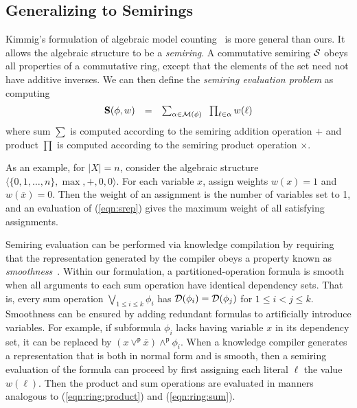 \documentclass[twoside,11pt]{article}
\newcommand{\pand}{\mathbin{\land^\textsf{p}}}
\newcommand{\por}{\mathbin{\lor^\textsf{p}}}
\newcommand{\obar}[1]{\overline{#1}}
\newcommand{\lit}{\ell}
\newcommand{\dependencyset}{{\cal D}}
\newcommand{\semiring}{{\cal S}}
\newcommand{\srep}{\textbf{S}}
\newcommand{\radd}{+}
\newcommand{\rmul}{\times}
\newcommand{\modelset}{{\cal M}}
\begin{document}
\subsection{Generalizing to Semirings}

Kimmig's formulation of algebraic model
counting~\cite{kimmig:jal:2017} is more general than ours.  It allows
the algebraic structure to be a \emph{semiring}.  A commutative
semiring $\semiring$ obeys all properties of a commutative ring, except that the
elements of the set need not have additive inverses.
We can then define the {\em semiring evaluation problem} as computing
  \begin{equation}
    \begin{array}{rcl}
    \srep(\phi, w) & = & \sum_{\alpha \in \modelset(\phi)} \;\; \prod_{\lit \in \alpha} w(\ell) \label{eqn:srep}
    \end{array}
  \end{equation}
  where sum $\sum$ is computed according to the semiring addition operation $\radd$ and product $\prod$
  is computed according to the semiring product operation $\rmul$.

  As an example, for $|X| = n$, consider the algebraic structure
  $\langle \{0, 1, \ldots, n\}, \max, +, 0, 0 \rangle$.
For each variable $x$, assign weights
$w(x) = 1$ and $w(\obar{x}) = 0$.  Then the
weight of an assignment is the number of variables set to 1, and an
evaluation of (\ref{eqn:srep}) gives the maximum weight of all
satisfying assignments.

Semiring evaluation can be performed via knowledge compilation
by requiring 
that the representation generated by
the compiler obeys a property known as
\emph{smoothness}~\cite{darwiche:jair:2002,shih:nips:2019}.  Within our formulation,
a partitioned-operation formula is smooth when all arguments to each
sum operation have identical dependency sets.  That is, every sum
operation $\bigvee_{1 \leq i \leq k} \phi_i$ has
$\dependencyset(\phi_i) = \dependencyset(\phi_j)$ for $1 \leq i < j
\leq k$.  Smoothness can be ensured by adding redundant formulas to
artificially introduce variables.  For example, if subformula $\phi_i$
lacks having variable $x$ in its dependency set, it can be replaced by
$(x \por \obar{x}) \pand \phi_i$.  When a knowledge compiler generates
a representation that is both in normal form and is smooth, then a semiring evaluation of the formula
can proceed by first assigning each literal $\lit$ the value $w(\lit)$.
Then the product and sum operations are evaluated in manners analogous to
(\ref{eqn:ring:product}) and
(\ref{eqn:ring:sum}).
\end{document}
